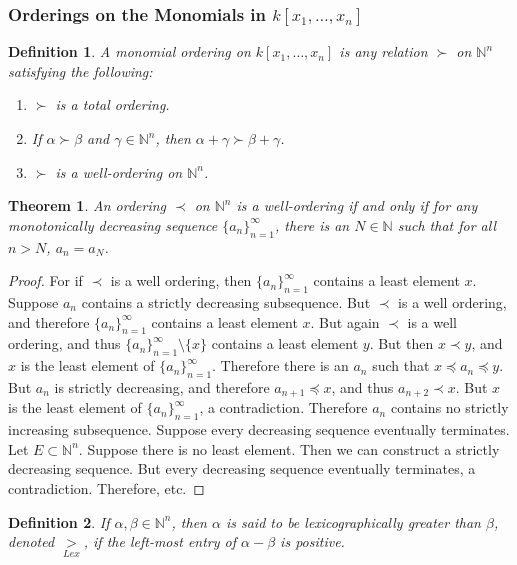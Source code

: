 \documentclass{article}
\theoremstyle{mystyle}
\newtheorem{theorem}{Theorem}[section]
\newtheorem{definition}{Definition}[section]
\begin{document}
\subsubsection{Orderings on the Monomials in \texorpdfstring{$k[x_1,\hdots ,x_n]$}{kx}}
\begin{definition}
A monomial ordering on $k[x_1,\hdots, x_n]$ is any relation $\succ$ on $\mathbb{N}^n$ satisfying the following:
\begin{enumerate}
    \item $\succ$ is a total ordering.
    \item If $\alpha \succ \beta$ and $\gamma \in \mathbb{N}^n$, then $\alpha+\gamma \succ \beta + \gamma$.
    \item $\succ$ is a well-ordering on $\mathbb{N}^n$. 
\end{enumerate}
\end{definition}
\begin{theorem}
An ordering $\prec$ on $\mathbb{N}^n$ is a well-ordering if and only if for any monotonically decreasing sequence $\{a_n\}_{n=1}^{\infty}$, there is an $N\in \mathbb{N}$ such that for all $n>N$, $a_n = a_N$.
\end{theorem}
\begin{proof}
For if $\prec$ is a well ordering, then $\{a_n\}_{n=1}^{\infty}$ contains a least element $x$. Suppose $a_n$ contains a strictly decreasing subsequence. But $\prec$ is a well ordering, and therefore $\{a_n\}_{n=1}^{\infty}$ contains a least element $x$. But again $\prec$ is a well ordering, and thus $\{a_n\}_{n=1}^{\infty} \setminus \{x\}$ contains a least element $y$. But then $x\prec y$, and $x$ is the least element of $\{a_n\}_{n=1}^{\infty}$. Therefore there is an $a_n$ such that $x\preceq a_n \preceq y$. But $a_n$ is strictly decreasing, and therefore $a_{n+1} \preceq x$, and thus $a_{n+2} \prec x$. But $x$ is the least element of $\{a_n\}_{n=1}^{\infty}$, a contradiction. Therefore $a_n$ contains no strictly increasing subsequence. Suppose every decreasing sequence eventually terminates. Let $E\subset \mathbb{N}^n$. Suppose there is no least element. Then we can construct a strictly decreasing sequence. But every decreasing sequence eventually terminates, a contradiction. Therefore, etc.
\end{proof}
\begin{definition}
If $\alpha,\beta \in \mathbb{N}^n$, then $\alpha$ is said to be lexicographically greater than $\beta$, denoted $\underset{Lex}{>}$, if the left-most entry of $\alpha-\beta$ is positive.
\end{definition}
\end{document}
